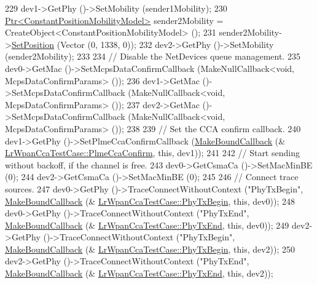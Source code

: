 \begin{DoxyCode}
229   dev1->GetPhy ()->SetMobility (sender1Mobility);
230   \hyperlink{classns3_1_1Ptr}{Ptr<ConstantPositionMobilityModel>} sender2Mobility = 
      CreateObject<ConstantPositionMobilityModel> ();
231   sender2Mobility->\hyperlink{classns3_1_1MobilityModel_ac584b3d5a309709d2f13ed6ada1e7640}{SetPosition} (Vector (0, 1338, 0));
232   dev2->GetPhy ()->SetMobility (sender2Mobility);
233 
234   \textcolor{comment}{// Disable the NetDevices queue management.}
235   dev0->GetMac ()->SetMcpsDataConfirmCallback (MakeNullCallback<void, McpsDataConfirmParams> ());
236   dev1->GetMac ()->SetMcpsDataConfirmCallback (MakeNullCallback<void, McpsDataConfirmParams> ());
237   dev2->GetMac ()->SetMcpsDataConfirmCallback (MakeNullCallback<void, McpsDataConfirmParams> ());
238 
239   \textcolor{comment}{// Set the CCA confirm callback.}
240   dev1->GetPhy ()->SetPlmeCcaConfirmCallback (\hyperlink{group__makeboundcallback_ga1725d6362e6065faa0709f7c93f8d770}{MakeBoundCallback} (&
      \hyperlink{classLrWpanCcaTestCase_af740f571b9d8594701c82480c8ff9632}{LrWpanCcaTestCase::PlmeCcaConfirm}, \textcolor{keyword}{this}, dev1));
241 
242   \textcolor{comment}{// Start sending without backoff, if the channel is free.}
243   dev0->GetCsmaCa ()->SetMacMinBE (0);
244   dev2->GetCsmaCa ()->SetMacMinBE (0);
245 
246   \textcolor{comment}{// Connect trace sources.}
247   dev0->GetPhy ()->TraceConnectWithoutContext (\textcolor{stringliteral}{"PhyTxBegin"}, \hyperlink{group__makeboundcallback_ga1725d6362e6065faa0709f7c93f8d770}{MakeBoundCallback} (&
      \hyperlink{classLrWpanCcaTestCase_a23a0238970a4597eb0e6f90cd5a2f5f5}{LrWpanCcaTestCase::PhyTxBegin}, \textcolor{keyword}{this}, dev0));
248   dev0->GetPhy ()->TraceConnectWithoutContext (\textcolor{stringliteral}{"PhyTxEnd"}, \hyperlink{group__makeboundcallback_ga1725d6362e6065faa0709f7c93f8d770}{MakeBoundCallback} (&
      \hyperlink{classLrWpanCcaTestCase_a10eb0d8851c2e8de313448bb2da6fd30}{LrWpanCcaTestCase::PhyTxEnd}, \textcolor{keyword}{this}, dev0));
249   dev2->GetPhy ()->TraceConnectWithoutContext (\textcolor{stringliteral}{"PhyTxBegin"}, \hyperlink{group__makeboundcallback_ga1725d6362e6065faa0709f7c93f8d770}{MakeBoundCallback} (&
      \hyperlink{classLrWpanCcaTestCase_a23a0238970a4597eb0e6f90cd5a2f5f5}{LrWpanCcaTestCase::PhyTxBegin}, \textcolor{keyword}{this}, dev2));
250   dev2->GetPhy ()->TraceConnectWithoutContext (\textcolor{stringliteral}{"PhyTxEnd"}, \hyperlink{group__makeboundcallback_ga1725d6362e6065faa0709f7c93f8d770}{MakeBoundCallback} (&
      \hyperlink{classLrWpanCcaTestCase_a10eb0d8851c2e8de313448bb2da6fd30}{LrWpanCcaTestCase::PhyTxEnd}, \textcolor{keyword}{this}, dev2));

\end{DoxyCode}
